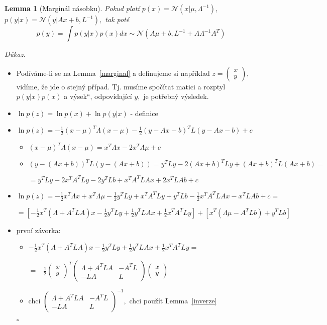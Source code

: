 \documentclass{article}
\newcommand{\uv}[1]{\quotedblbase #1\textquotedblleft}
\newenvironment{pitemize}{
\begin{itemize}
  \setlength{\itemsep}{5pt}
  \setlength{\parskip}{0pt}
  \setlength{\parsep}{0pt}
}{\end{itemize}}
\newenvironment{pproof}{
\noindent\emph{Důkaz.}
\begin{pitemize}
}{\hfill$\square$\end{pitemize}}
\newcommand{\NN}{\mathcal{N}}
\newtheorem{lemma}{Lemma}
\theoremstyle{definition}
\begin{document}
\begin{lemma}[Marginál násobku]
\label{convolution}
Pokud platí $p(x)=\NN\left(x|\mu,\Lambda^{-1}\right)$, $p(y|x)=\NN\left(y|Ax+b,L^{-1}\right),$ tak poté $$p(y)=\int p(y|x)p(x) d x \sim \NN\left(A\mu+b,L^{-1}+A\Lambda^{-1} A^T\right)$$
\end{lemma}
\begin{pproof}
\item Podíváme-li se na Lemma~\ref{marginal} a definujeme si například $z=\left(\begin{matrix} x \\ y \end{matrix} \right)$, vidíme, že jde o stejný případ. Tj. musíme spočítat matici a rozptyl $p(y|x)p(x)$ a \uv{výsek}, odpovídající $y,$ je potřebný výsledek.
\item $\ln p(z)=\ln p(x)+\ln p(y|x)$ - definice
\item $\ln p(z) = -\frac{1}{2}(x-\mu)^T\Lambda(x-\mu)-\frac{1}{2}(y-Ax-b)^TL(y-Ax-b)+c$
\begin {itemize}
\item $(x-\mu)^T\Lambda(x-\mu)=x^T\Lambda x-2x^T\Lambda\mu+c$
\item $(y-(Ax+b))^TL(y-(Ax+b))=y^TLy - 2(Ax+b)^TLy + (Ax+b)^TL(Ax+b) =$

$= y^TLy - 2x^TA^TLy -2y^TLb+x^TA^TLAx+2x^TLAb+c$
\end{itemize}
\item $\ln p(z)=-\frac{1}{2}x^T\Lambda x+x^T\Lambda\mu-\frac{1}{2}y^TLy +x^TA^TLy +y^TLb-\frac{1}{2}x^TA^TLAx-x^TLAb+c=$

$=\left[-\frac{1}{2}x^T\left(\Lambda+A^TLA  \right)x-\frac{1}{2}y^TLy+\frac{1}{2}y^TLAx+ \frac{1}{2}x^TA^TLy\right]+\left[x^T\left(\Lambda\mu - A^TLb\right) + y^TLb \right]$
\item první závorka:

\begin{itemize}
\item $-\frac{1}{2}x^T\left(\Lambda+A^TLA  \right)x-\frac{1}{2}y^TLy+\frac{1}{2}y^TLAx+ \frac{1}{2}x^TA^TLy=$

$= -\frac{1}{2}\left( \begin{matrix}x \\ y\end{matrix} \right)^T  \left( \begin{matrix}\Lambda+A^TLA & -A^TL \\ -LA&L\end{matrix} \right)\left( \begin{matrix}x \\ y\end{matrix} \right)$
\item chci $\left( \begin{matrix}\Lambda+A^TLA & -A^TL \\ -LA&L\end{matrix} \right)^{-1},$ chci použít Lemma~\ref{inverze}



\end{itemize}
\end{pproof}
\end{document}
